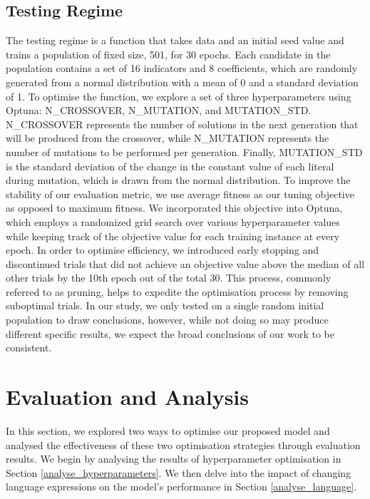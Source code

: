 \documentclass{IEEEtran}
\begin{document}
\subsection{Testing Regime}
The testing regime is a function that takes data and an initial seed value and trains a population of fixed size, 501, for 30 epochs. Each candidate in the population contains a set of 16 indicators and 8 coefficients, which are randomly generated from a normal distribution with a mean of 0 and a standard deviation of 1. To optimise the function, we explore a set of three hyperparameters using Optuna: N\_CROSSOVER, N\_MUTATION, and MUTATION\_STD. N\_CROSSOVER represents the number of solutions in the next generation that will be produced from the crossover, while N\_MUTATION represents the number of mutations to be performed per generation. Finally, MUTATION\_STD is the standard deviation of the change in the constant value of each literal during mutation, which is drawn from the normal distribution. 
To improve the stability of our evaluation metric, we use average fitness as our tuning objective as opposed to maximum fitness. We incorporated this objective into Optuna, which employs a randomized grid search over various hyperparameter values while keeping track of the objective value for each training instance at every epoch. In order to optimise efficiency, we introduced early stopping and discontinued trials that did not achieve an objective value above the median of all other trials by the 10th epoch out of the total 30. This process, commonly referred to as pruning, helps to expedite the optimisation process by removing suboptimal trials. In our study, we only tested on a single random initial population to draw conclusions, however, while not doing so may produce different specific results, we expect the broad conclusions of our work to be consistent.









\section{Evaluation and Analysis} \label{evaluation}
In this section, we explored two ways to optimise our proposed model and analysed the effectiveness of these two optimisation strategies through evaluation results. We begin by analysing the results of hyperparameter optimisation in Section \ref{analyse_hyperparameters}. We then delve into the impact of changing language expressions on the model's performance in Section \ref{analyse_language}. 
\end{document}
